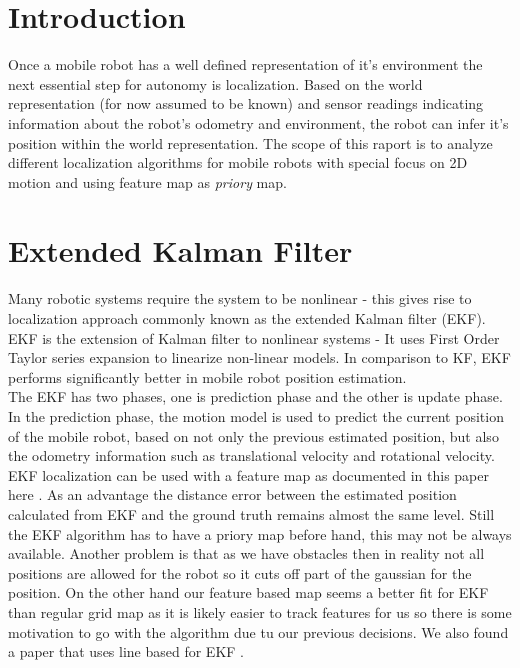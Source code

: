 \documentclass[12pt, a4paper, onecolumn]{article}
\begin{document}
\maketitle

\section{Introduction}

Once a mobile robot has a well defined representation of it's environment the next essential step for autonomy is localization.
Based on the world representation (for now assumed to be known) and sensor readings indicating information about the robot's odometry and environment, the robot can infer it's position within the world representation. 
The scope of this raport is to analyze different localization algorithms for mobile robots with special focus on 2D motion and using feature map as \emph{priory} map.

\section{Extended Kalman Filter}

Many robotic systems require the system to be nonlinear - this gives rise to localization approach commonly known as the extended Kalman filter (EKF)\cite{Overview2021}.
EKF is the extension of Kalman filter to nonlinear systems -
It uses First Order Taylor series expansion to linearize non-linear models\cite{Overview2021}.
In comparison to KF, EKF performs significantly better in mobile robot position estimation\cite{Suliman2010}. \\

The EKF has two phases, one is prediction phase and the other is update phase. 
In the prediction phase, the motion model is used to predict the current position of the mobile robot, based on not only the previous estimated position, but also the odometry information such as translational velocity and rotational velocity. \cite{featureEKF} \\

EKF localization can be used with a feature map as documented in this paper here \cite{featureEKF}. 
As an advantage the distance error between the estimated position calculated from EKF and the ground truth remains almost the same level\cite{Overview2021}. 
Still the EKF algorithm has to have a priory map before hand, this may not be always available. \cite{featureEKF}
Another problem is that as we have obstacles then in reality not all positions are allowed for the robot so it cuts off part of the gaussian for the position.
On the other hand our feature based map seems a better fit for EKF than regular grid map as it is likely easier to track features for us so there is some motivation to go with the algorithm due tu our previous decisions.
We also found a paper that uses line based for EKF \cite{lineEKF}.
\end{document}
